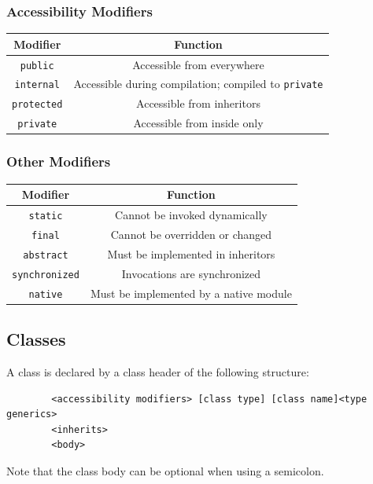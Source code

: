 \documentclass{docs}
\begin{document}
    \subsubsection{Accessibility Modifiers}
    \begin{center}
    \begin{tabular}{c|c}
        Modifier & Function \\
        \hline
        \texttt{public} & Accessible from everywhere \\
        \texttt{internal} & Accessible during compilation; compiled to \texttt{private} \\
        \texttt{protected} & Accessible from inheritors \\
        \texttt{private} & Accessible from inside only
    \end{tabular}
    \end{center}
    
    \subsubsection{Other Modifiers}
    \begin{center}
    \begin{tabular}{c|c}
        Modifier & Function \\
        \hline
        \label{modStatic}
        \texttt{static} & Cannot be invoked dynamically \\
        \label{modFinal}
        \texttt{final} & Cannot be overridden or changed \\
        \label{modAbstract}
        \texttt{abstract} & Must be implemented in inheritors \\
        \label{modSynchronized}
        \texttt{synchronized} & Invocations are synchronized \\
        \label{modNative}
        \texttt{native} & Must be implemented by a native module
    \end{tabular}
    \end{center}
    
    \subsection{Classes}
    A class is declared by a class header of the following structure:
    \begin{verbatim}
        <accessibility modifiers> [class type] [class name]<type generics>
        <inherits>
        <body>
    \end{verbatim}
    Note that the class body can be optional when using a semicolon.
    
\end{document}
